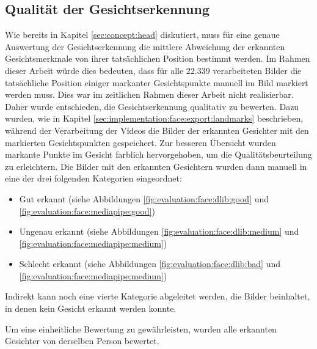 \subsection{Qualität der Gesichtserkennung}\label{sec:evaluation:plan:quality:face}

Wie bereits in Kapitel \ref{sec:concept:head} diskutiert, muss für eine genaue Auswertung der Gesichtserkennung die mittlere Abweichung der erkannten Gesichtsmerkmale von ihrer tatsächlichen Position \cite{paper:evaluation-face} bestimmt werden. Im Rahmen dieser Arbeit würde dies bedeuten, dass für alle 22.339 verarbeiteten Bilder die tatsächliche Position einiger markanter Gesichtspunkte manuell im Bild markiert werden muss. Dies war im zeitlichen Rahmen dieser Arbeit nicht realisierbar. Daher wurde entschieden, die Gesichtserkennung qualitativ zu bewerten. Dazu wurden, wie in Kapitel \ref{sec:implementation:face:export:landmarks} beschrieben, während der Verarbeitung der Videos die Bilder der erkannten Gesichter mit den markierten Gesichtspunkten gespeichert. Zur besseren Übersicht wurden markante Punkte im Gesicht farblich hervorgehoben, um die Qualitätsbeurteilung zu erleichtern. Die Bilder mit den erkannten Gesichtern wurden dann manuell in eine der drei folgenden Kategorien eingeordnet:  

\begin{itemize}
\item Gut erkannt (siehe Abbildungen \ref{fig:evaluation:face:dlib:good} und \ref{fig:evaluation:face:mediapipe:good})
\item Ungenau erkannt (siehe Abbildungen \ref{fig:evaluation:face:dlib:medium} und \ref{fig:evaluation:face:mediapipe:medium})
\item Schlecht erkannt (siehe Abbildungen \ref{fig:evaluation:face:dlib:bad} und \ref{fig:evaluation:face:mediapipe:medium})
\end{itemize}

Indirekt kann noch eine vierte Kategorie abgeleitet werden, die Bilder beinhaltet, in denen kein Gesicht erkannt werden konnte.

Um eine einheitliche Bewertung zu gewährleisten, wurden alle erkannten Gesichter von derselben Person bewertet. 

